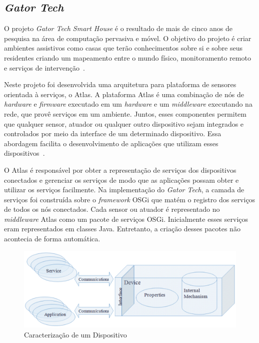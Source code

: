 \subsection{\emph{Gator Tech}}

O projeto \emph{Gator Tech Smart House} é o resultado de mais de cinco anos de pesquisa na área de computação pervasiva e móvel. O objetivo do projeto é criar ambientes assistivos como casas que terão conhecimentos sobre si e sobre seus residentes criando um mapeamento entre o mundo físico, monitoramento remoto e serviços de intervenção~\cite{gatorTech}.

Neste projeto foi desenvolvida uma arquitetura para plataforma de sensores orientada à serviços, o Atlas. A plataforma Atlas é uma combinação de nós de \emph{hardware} e \emph{firmware} executado em um \emph{hardware} e um \emph{middleware} executando na rede, que provê serviços em um ambiente. Juntos, esses componentes permitem que qualquer sensor, atuador ou qualquer outro dispositivo sejam integrados e controlados por meio da interface de um determinado dispositivo. Essa abordagem facilita o desenvolvimento de aplicações que utilizam esses dispositivos~\cite{gatorTechLessons}. 

O Atlas é responsável por obter a representação de serviços dos dispositivos conectados e gerenciar os serviços de modo que as aplicações possam obter e utilizar os serviços facilmente. Na implementação do \emph{Gator Tech}, a camada de serviços foi construída sobre o \emph{framework} OSGi que matém o registro dos serviços de todos os nós conectados. Cada sensor ou atuador é representado no \emph{middleware} Atlas como um pacote de serviços OSGi. Inicialmente esses serviços eram representados em classes Java. Entretanto, a criação desses pacotes não acontecia de forma automática. 

\begin{figure}[ht]
\center
\includegraphics[scale=0.4]{imagens/gatorDDL}
\caption{Caracterização de um Dispositivo~\cite{ddlSpec}}
\label{fig:ddlspec}
\end{figure}

